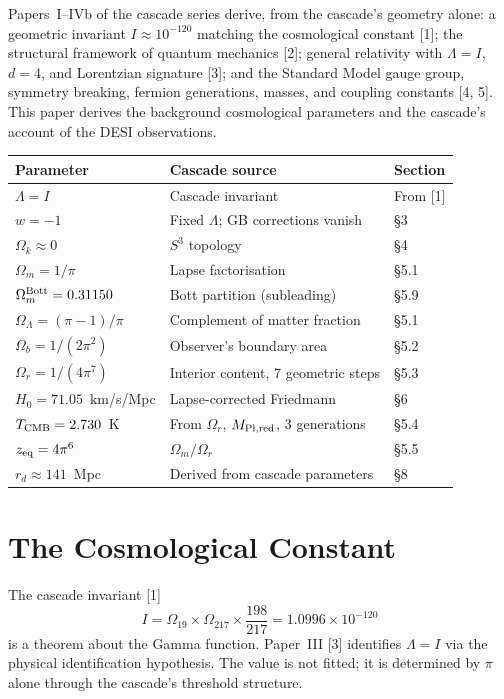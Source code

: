 \documentclass[12pt,a4paper]{article}
\begin{document}
Papers~I--IVb of the cascade series derive, from the cascade's geometry alone: a geometric
invariant $I \approx 10^{-120}$ matching the cosmological constant [1]; the structural framework
of quantum mechanics [2]; general relativity with $\Lambda = I$, $d = 4$, and Lorentzian
signature [3]; and the Standard Model gauge group, symmetry breaking, fermion generations,
masses, and coupling constants [4, 5]. This paper derives the background cosmological
parameters and the cascade's account of the DESI observations.

\begin{center}
\begin{tabular}{lll}
\hline
Parameter & Cascade source & Section \\
\hline
$\Lambda = I$ & Cascade invariant & From [1] \\
$w = -1$ & Fixed $\Lambda$; GB corrections vanish & \S3 \\
$\Omega_k \approx 0$ & $S^3$ topology & \S4 \\
$\Omega_m = 1/\pi$ & Lapse factorisation & \S5.1 \\
$\Omega_m^{\rm Bott} = 0.31150$ & Bott partition (subleading) & \S5.9 \\
$\Omega_\Lambda = (\pi-1)/\pi$ & Complement of matter fraction & \S5.1 \\
$\Omega_b = 1/(2\pi^2)$ & Observer's boundary area & \S5.2 \\
$\Omega_r = 1/(4\pi^7)$ & Interior content, 7 geometric steps & \S5.3 \\
$H_0 = 71.05$~km/s/Mpc & Lapse-corrected Friedmann & \S6 \\
$T_{\rm CMB} = 2.730$~K & From $\Omega_r$, $M_{\rm Pl,red}$, 3 generations & \S5.4 \\
$z_{\rm eq} = 4\pi^6$ & $\Omega_m/\Omega_r$ & \S5.5 \\
$r_d \approx 141$~Mpc & Derived from cascade parameters & \S8 \\
\hline
\end{tabular}
\end{center}

\section{The Cosmological Constant}

The cascade invariant [1]
\[
I = \Omega_{19} \times \Omega_{217} \times \frac{198}{217} = 1.0996 \times 10^{-120}
\]
is a theorem about the Gamma function. Paper~III [3] identifies $\Lambda = I$ via the physical
identification hypothesis. The value is not fitted; it is determined by $\pi$ alone through
the cascade's threshold structure.
\end{document}
